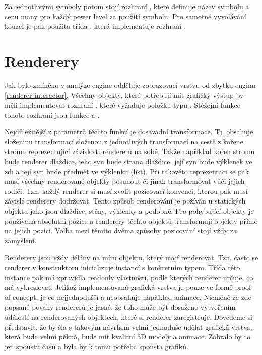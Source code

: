 Za jednotlivými symboly potom stojí rozhraní  , které definuje název symbolu a cenu many pro každý power level
za použití symbolu. Pro samotné vyvolávání kouzel je pak použita třída , která implementuje rozhraní
.

\section{Renderery}
Jak bylo zmíněno v analýze engine odděluje zobrazovací vrstvu od zbytku enginu \vref{renderer-interactor}. Všechny objekty,
které potřebují mít grafický výstup by měli implementovat rozhraní , které vyžaduje položku typu . 
Stěžejní funkce tohoto rozhraní jsou funkce  a . 

Nejdůležitější z parametrů těchto funkcí je dosavadní transformace. Tj. obsahuje složeninu transformací složenou z jednotlivých
transformací na cestě z kořene stromu reprezentující závislosti rendererů na sobě. Takže například kořen stromu bude renderer
dlaždice, jeho syn bude strana dlaždice, její syn bude výklenek ve zdi a její syn bude předmět ve
výklenku (list). Při takovéto reprezentaci se pak musí všechny renderované objekty posunout či jinak transformovat vůči jejich rodiči.
Tzn. každý renderer si musí zvolit pozicovací konvenci, kterou pak musí závislé renderery dodržovat. Tento způsob renderování je požíván u statických objektu jako
jsou dlaždice, stěny, výklenky a podobně. Pro pohybující objekty je používaná absolutní pozice a renderery
těchto objektů transformují objekty přímo na jejich pozici. Volba mezi těmito dvěma způsoby pozicování stojí vždy za zamyšlení.

Renderery jsou vždy dělány na míru objektu, který mají renderovat. Tzn. často se renderer v konstruktoru 
inicializuje instancí s konkretním typem. Třída této instance pak má zpravidla readonly vlastnosti,
podle kterých renderer určuje, co má vykreslovat. Jelikož implementovaná grafická vrstva je pouze ve formě proof of concept,
je co nejjednodušší a neobsahuje například animace. Nicméně ze zde popsané povahy rendererů je jasné, že 
toho může být dosaženo vytvořením událostí na renderovaných objektech, které si renderer zaregistruje.
Dovedeme si představit, že by šla s takovým návrhem velmi jednoduše udělat grafická vrstva, která bude
velmi pěkná, bude mít kvalitní 3D modely a animace. Zabralo by to jen spoustu času a byla by k tomu potřeba spousta grafiků.

